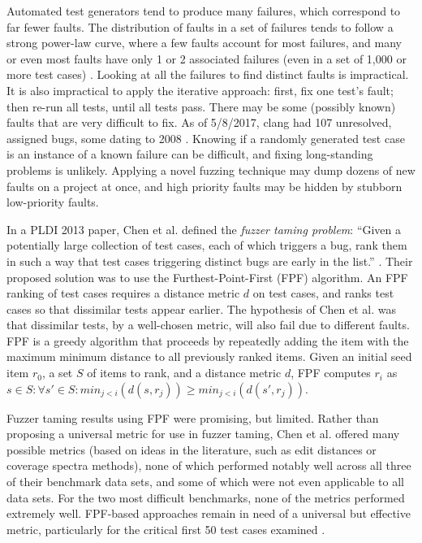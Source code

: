 Automated test generators tend to produce many failures, which correspond to far fewer faults.  The distribution of faults in a set of failures tends to follow a strong power-law curve, where a few faults account for most failures, and many or even most faults have only 1 or 2 associated failures (even in a set of 1,000 or more test cases) \cite{PLDI13,OneTest}.  Looking at all the failures to find  distinct faults is impractical.  It is also impractical to apply the iterative approach:  first, fix one test's fault; then re-run all tests, until all tests pass.  There may be some (possibly known) faults that are very difficult to fix. As of 5/8/2017, clang had 107 unresolved, assigned bugs, some dating to 2008 \cite{clangbugs}.  Knowing if a randomly generated test case is an instance of a known failure can be difficult, and fixing long-standing problems is unlikely.    Applying a novel fuzzing technique \cite{csmith,ISSTA12,ZhendongPLDI} may dump dozens of new faults on a project at once, and high priority faults may be hidden by stubborn low-priority faults.

In a PLDI 2013 paper, Chen et al. defined the \emph{fuzzer taming problem}: ``Given a potentially large collection of test cases, each of which triggers a bug, rank them in such a way that test cases triggering distinct bugs are early in the list.'' \cite{PLDI13}.  Their proposed solution was to use the Furthest-Point-First \cite{Gonzalez} (FPF) algorithm.  An FPF ranking of test cases requires a distance metric $d$ on test cases, and ranks test cases so that dissimilar tests appear earlier.  The hypothesis of Chen et al. was that dissimilar tests, by a well-chosen metric, will also fail due to different faults.
FPF is a greedy algorithm that proceeds by repeatedly adding the item with the maximum minimum distance to all previously ranked items. Given an initial seed item $r_0$, a set
$S$ of items to rank, and a distance metric $d$, FPF computes $r_i$ as $s \in S: \forall s' \in S: min_{ j < i}(d(s,r_j)) \geq min_{j < i}(d(s',r_j))$.

Fuzzer taming results using FPF were promising, but limited.  Rather than proposing a universal metric for use in fuzzer taming, Chen et al. offered many possible metrics (based on ideas in the literature, such as edit distances \cite{lev} or coverage spectra \cite{RepsSpectra} methods), none of which performed notably well across all three of their benchmark data sets, and some of which were not even applicable to all data sets.  For the two most difficult benchmarks, none of the metrics performed extremely well. FPF-based approaches remain in need of a universal but effective metric, particularly for the critical first 50 test cases examined \cite{PLDI13}.

